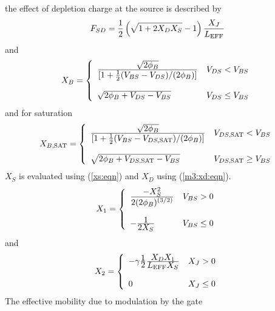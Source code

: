 {the effect of depletion charge at the source is described by
\begin{equation}
F_{SD} = \frac{1}{2}\left( \sqrt{1+2X_DX_S}-1\right)
         {{\textstyle X_J}\over{L_{\mbox{\scriptsize EFF}}}}
\end{equation}
and
\begin{equation}
X_B = \left\{ \begin{array}{ll}
{{\textstyle\sqrt{\PHI}}\over{\textstyle[1+ \frac{1}{2}(V_{BS}-V_{DS})/(\PHI)]}}
         & V_{DS} <V_{BS}\\
     \\
     \sqrt{\PHI+V_{DS}-V_{BS}} & V_{DS} \le V_{BS}\\
     \end{array} \right. %
\end{equation}
and for saturation
\begin{equation}
X_{B,\ms{SAT}} = \left\{ \begin{array}{ll}
{{\textstyle\sqrt{\PHI}}\over{\textstyle[1+
         \frac{1}{2}(V_{BS}-V_{DS,\ms{SAT}})/(\PHI)]}}
         & V_{DS,\ms{SAT}} <V_{BS}\\
     \\
     \sqrt{\PHI+V_{DS,\ms{SAT}}-V_{BS}} & V_{DS,\ms{SAT}} \ge  V_{BS}\\
     \end{array} \right. %
\end{equation}
$X_S$ is evaluated using (\ref{xs:eqn}) and $X_D$ using (\ref{m3:xd:eqn}).
\begin{equation}
X_1 = \left\{ \begin{array}{ll}
           {{\textstyle -X_S^2}\over{\textstyle 2(\PHI)^{(3/2)} }}
         & V_{BS} > 0 \\
     \\
           -{{\textstyle 1}\over{\textstyle 2X_S}}
         & V_{BS} \le 0
     \end{array} \right. %
\end{equation}
and
\begin{equation}
X_2 = \left\{ \begin{array}{ll}
           -\GAMMA {{\textstyle 1}\over{\textstyle 2}}
           {{\textstyle X_DX_1}\over{\textstyle L_{\ms{EFF}} X_S}}
         & \XJ  > 0 \\
     \\
           0 & \XJ \le 0
     \end{array} \right. %
\end{equation}
The effective mobility due to modulation by the gate
}
